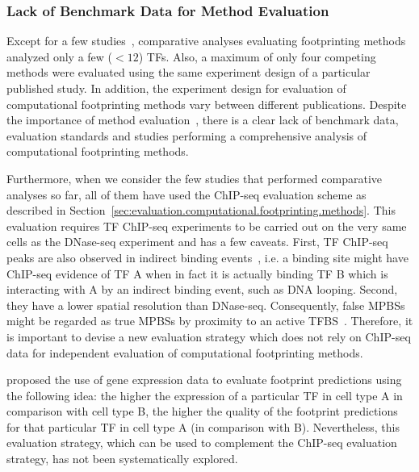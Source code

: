 \subsubsection{Lack of Benchmark Data for Method Evaluation}

Except for a few studies~\citep{sherwood2014, yardimci2014, kahara2015}, comparative analyses evaluating footprinting methods analyzed only a few ($<12$) TFs. Also, a maximum of only four competing methods were evaluated using the same experiment design of a particular published study. In addition, the experiment design for evaluation of computational footprinting methods vary between different publications. Despite the importance of method evaluation~\citep{rusk2015}, there is a clear lack of benchmark data, evaluation standards and studies performing a comprehensive analysis of computational footprinting methods.

Furthermore, when we consider the few studies that performed comparative analyses so far, all of them have used the ChIP-seq evaluation scheme as described in Section~\ref{sec:evaluation.computational.footprinting.methods}. This evaluation requires TF ChIP-seq experiments to be carried out on the very same cells as the DNase-seq experiment and has a few caveats. First, TF ChIP-seq peaks are also observed in indirect binding events~\citep{yardimci2014}, i.e. a binding site might have ChIP-seq evidence of TF A when in fact it is actually binding TF B which is interacting with A by an indirect binding event, such as DNA looping. Second, they have a lower spatial resolution than DNase-seq. Consequently, false MPBSs might be regarded as true MPBSs by proximity to an active TFBS~\citep{cuellar2012,yardimci2014}. Therefore, it is important to devise a new evaluation strategy which does not rely on ChIP-seq data for independent evaluation of computational footprinting methods.

\cite{yardimci2014} proposed the use of gene expression data to evaluate footprint predictions using the following idea: the higher the expression of a particular TF in cell type A in comparison with cell type B, the higher the quality of the footprint predictions for that particular TF in cell type A (in comparison with B). Nevertheless, this evaluation strategy, which can be used to complement the ChIP-seq evaluation strategy, has not been systematically explored.

